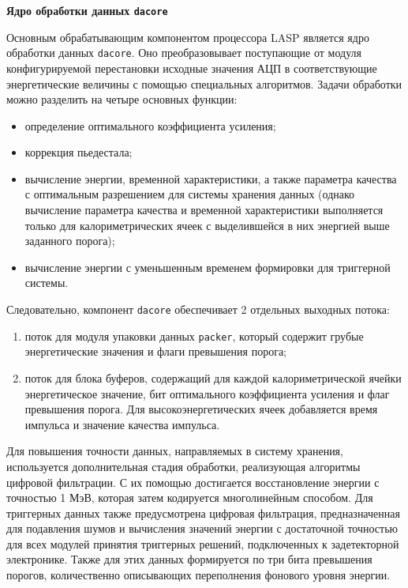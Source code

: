 \textbf{Ядро обработки данных \texttt{dacore}}\par
Основным обрабатывающим компонентом процессора LASP является ядро обработки данных \texttt{dacore}. Оно преобразовывает поступающие от модуля конфигурируемой перестановки исходные значения АЦП в соответствующие энергетические величины с помощью специальных алгоритмов. Задачи обработки можно разделить на четыре основных функции:\par
\begin{itemize}
    \item определение оптимального коэффициента усиления;
    \item коррекция пьедестала;
    \item вычисление энергии, временной характеристики, а также параметра качества с оптимальным разрешением для системы хранения данных (однако вычисление параметра качества и временной характеристики выполняется только для калориметрических ячеек с выделившейся в них энергией выше заданного порога);
    \item вычисление энергии с уменьшенным временем формировки для триггерной системы.
\end{itemize}\par
Следовательно, компонент \texttt{dacore} обеспечивает 2 отдельных выходных потока:\par
\begin{enumerate}
    \item поток для модуля упаковки данных \texttt{packer}, который содержит грубые энергетические значения и флаги превышения порога;
    \item поток для блока буферов, содержащий для каждой калориметрической ячейки энергетическое значение, бит оптимального коэффициента усиления и флаг превышения порога. Для высокоэнергетических ячеек добавляется время импульса и значение качества импульса.
\end{enumerate}\par
Для повышения точности данных, направляемых в систему хранения, используется дополнительная стадия обработки, реализующая алгоритмы цифровой фильтрации. С их помощью достигается восстановление энергии с точностью 1 МэВ, которая затем кодируется многолинейным способом. Для триггерных данных также предусмотрена цифровая фильтрация, предназначенная для подавления шумов и вычисления значений энергии с достаточной точностью для всех модулей принятия триггерных решений, подключенных к задетекторной электронике. Также для этих данных формируется по три бита превышения порогов, количественно описывающих переполнения фонового уровня энергии.\par
